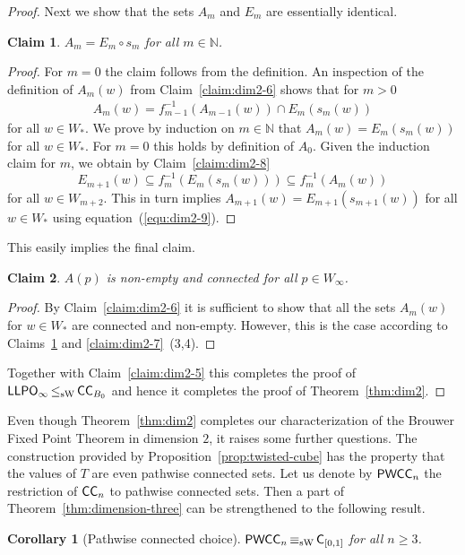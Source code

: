 \documentclass[a4paper]{amsart}
\def\IN{{\mathbb{N}}}
\def\In{\subseteq}
\def\LLPO{\text{\rm\sffamily LLPO}}
\def\C{\mbox{\rm\sffamily C}}
\def\ConC{\mbox{\rm\sffamily CC}}
\def\LLPO{\mbox{\rm\sffamily LLPO}}
\def\PWCC{\text{\rm\sffamily PWCC}}
\def\leqSW{\mathop{\leq_{\mathrm{sW}}}}
\def\equivSW{\mathop{\equiv_{\mathrm{sW}}}}
\newtheorem{corollary}[theorem]{Corollary}
\newtheorem{localclaim}{Claim}[theorem]
\theoremstyle{definition}
\begin{document}
\begin{proof}
Next we show that the sets $A_m$ and $E_m$ are essentially identical.

\begin{localclaim}
\label{claim:dim2-9}
$A_m=E_m\circ s_m$ for all $m\in\IN$.
\end{localclaim}
\begin{proof}
For $m=0$ the claim follows from the definition.
An inspection of the definition of $A_m(w)$ from Claim~\ref{claim:dim2-6} shows that for $m>0$
\begin{eqnarray}
\label{equ:dim2-9}
A_{m}(w)=f_{m-1}^{-1}(A_{m-1}(w))\cap E_{m}(s_{m}(w))
\end{eqnarray}
for all $w\in W_*$. We prove by induction on $m\in\IN$ that $A_m(w)=E_{m}(s_{m}(w))$ for all $w\in W_*$.
For $m=0$ this holds by definition of $A_0$. Given the induction claim for $m$, we obtain by Claim~\ref{claim:dim2-8}
\[E_{m+1}(w)\In f_m^{-1}(E_m(s_m(w)))\In f_m^{-1}(A_m(w))\] 
for all $w\in W_{m+2}$.
This in turn implies $A_{m+1}(w)=E_{m+1}(s_{m+1}(w))$ for all $w\in W_*$ using equation~(\ref{equ:dim2-9}).
\end{proof}

This easily implies the final claim.

\begin{localclaim}
$A(p)$ is non-empty and connected for all $p\in W_\infty$.
\end{localclaim}
\begin{proof}
By Claim~\ref{claim:dim2-6} it is sufficient to show that all the sets $A_m(w)$ for $w\in W_*$ are connected and non-empty.
However, this is the case according to Claims~\ref{claim:dim2-9} and \ref{claim:dim2-7}~(3,4).
\end{proof}
 
Together with Claim~\ref{claim:dim2-5} this completes the proof of $\LLPO_\infty\leqSW\ConC_{B_0}$ and
hence it completes the proof of Theorem~\ref{thm:dim2}.
\end{proof}

Even though Theorem~\ref{thm:dim2} completes our characterization of the Brouwer Fixed Point Theorem in dimension $2$,
it raises some further questions. The construction provided by Proposition~\ref{prop:twisted-cube} has the property that the values of
$T$ are even pathwise connected sets. Let us denote by $\PWCC_n$ the restriction of $\ConC_n$ to pathwise connected sets. Then a part of
Theorem~\ref{thm:dimension-three} can be strengthened to the following result.

\begin{corollary}[Pathwise connected choice]
$\PWCC_n\equivSW\C_{[0,1]}$ for all $n\geq 3$.
\end{corollary}
\end{document}
